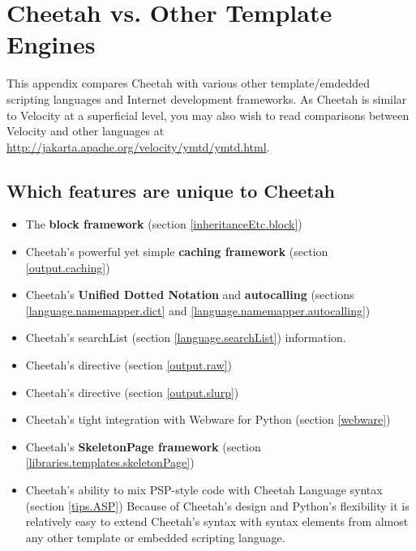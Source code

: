 \section{Cheetah vs. Other Template Engines}
\label{comparisons}

This appendix compares Cheetah with various other template/emdedded scripting
languages and Internet development frameworks.  As Cheetah is similar to
Velocity at a superficial level, you may also wish to read comparisons between
Velocity and other languages at
\url{http://jakarta.apache.org/velocity/ymtd/ymtd.html}.

\subsection{Which features are unique to Cheetah}
\label{comparisons.unique}

\begin{itemize}
\item The {\bf block framework} (section \ref{inheritanceEtc.block})
\item Cheetah's powerful yet simple {\bf caching framework} (section
     \ref{output.caching})
\item Cheetah's {\bf Unified Dotted Notation} and {\bf autocalling}
     (sections \ref{language.namemapper.dict} and
     \ref{language.namemapper.autocalling})
\item Cheetah's searchList (section \ref{language.searchList})
     information.
\item Cheetah's  directive (section \ref{output.raw})
\item Cheetah's  directive (section \ref{output.slurp})
\item Cheetah's tight integration with Webware for Python (section
     \ref{webware})
\item Cheetah's {\bf SkeletonPage framework} (section
     \ref{libraries.templates.skeletonPage})
\item Cheetah's ability to mix PSP-style code with Cheetah
     Language syntax (section \ref{tips.ASP}) 
     Because of Cheetah's design and Python's flexibility it is
     relatively easy to extend Cheetah's syntax with syntax elements from almost
     any other template or embedded scripting language.
\end{itemize}


